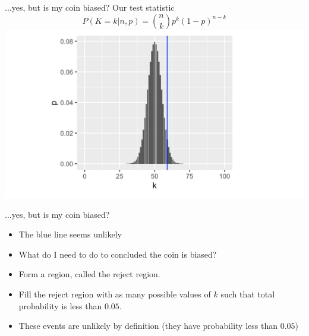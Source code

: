 \documentclass{bredelebeamer}
\begin{document}
\begin{frame}{...yes, but is my coin biased?}
Our test statistic
\begin{equation}
P(K = k|n, p) = {n \choose k}p^k(1-p)^{n - k}
\end{equation}
\includegraphics[width=1\textwidth]{teststatistics}



\end{frame}

\begin{frame}{...yes, but is my coin biased?}
\begin{block}{}
	\begin{itemize}
		\item The blue line seems unlikely
		\item What do I need to do to concluded the coin is biased?
		\item Form a region, called the reject region.
		\item Fill the reject region with as many possible values of $k$ such that total probability is less than $0.05$.
		\item These events are unlikely by definition (they have probability less than $0.05$)
	\end{itemize}

\end{block}

\end{frame}
\end{document}
